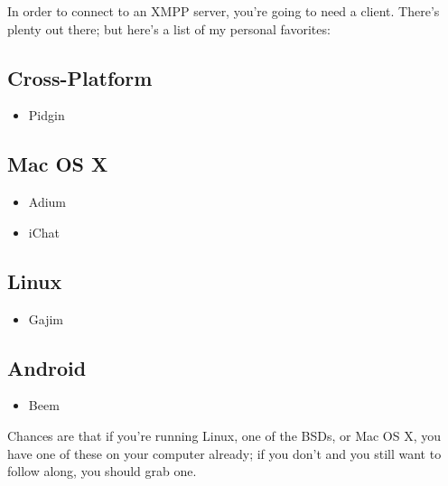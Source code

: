 \newpage

In order to connect to an XMPP server, you're going to need a client.  There's plenty out there;
but here's a list of my personal favorites:

\pause
\subsection*{Cross-Platform}

\begin{itemize}
\item Pidgin
\end{itemize}

\pause
\subsection*{Mac OS X}

\begin{itemize}
\item Adium
\item iChat
\end{itemize}

\pause
\subsection*{Linux}

\begin{itemize}
\item Gajim
\end{itemize}

\pause
\subsection*{Android}

\begin{itemize}
\item Beem
\end{itemize}

\newpage
Chances are that if you're running Linux, one of the BSDs, or Mac OS X, you have one of these on your computer already;
if you don't and you still want to follow along, you should grab one.
